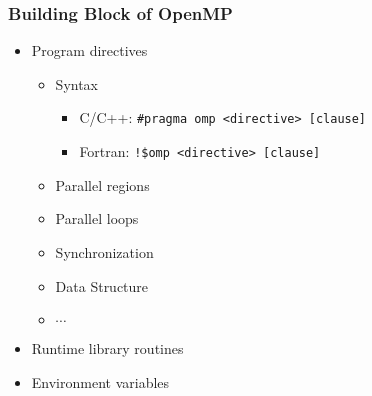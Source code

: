 \documentclass[c,mathserif,compress,xcolor=svgnames]{beamer}
\newenvironment{eblock}[0]
{
\begin{beamerboxesrounded}[upper=uppercol2,lower=lowercol2,shadow=true]}
{\end{beamerboxesrounded}}
\begin{document}
\begin{frame}
  \frametitle{\small Building Block of OpenMP}
  \begin{eblock}{}
    \begin{itemize}
      \item Program directives
        \begin{itemize}
          \item Syntax
            \begin{itemize}
              \item C/C++: \texttt{\#pragma omp <directive> [clause]}
              \item Fortran: \texttt{!\$omp <directive> [clause]}
            \end{itemize}
          \item Parallel regions
          \item Parallel loops
          \item Synchronization
          \item Data Structure
          \item $\cdots$
        \end{itemize}
      \item Runtime library routines
      \item Environment variables
    \end{itemize}
  \end{eblock}
\end{frame}
\end{document}
